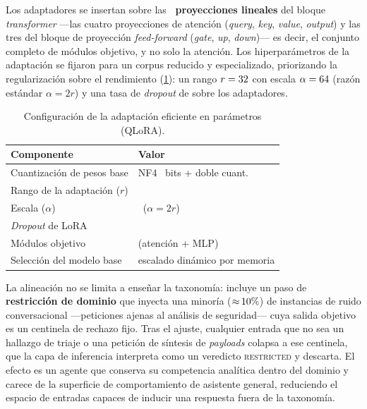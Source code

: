 Los adaptadores se insertan sobre las \textbf{\IALoraModulos{}~proyecciones
lineales} del bloque \emph{transformer} ---las cuatro proyecciones de atención
(\emph{query}, \emph{key}, \emph{value}, \emph{output}) y las tres del bloque de
proyección \emph{feed-forward} (\emph{gate}, \emph{up}, \emph{down})--- es decir,
el conjunto completo de módulos objetivo, y no solo la atención. Los
hiperparámetros de la adaptación se fijaron para un corpus reducido y
especializado, priorizando la regularización sobre el rendimiento
(\cref{tab:ia-qlora}): un rango $r = \num{32}{}$ con escala
$\alpha = \num{64}{}$ (razón estándar $\alpha = 2r$) y una tasa de
\emph{dropout} de \IALoraDropout{} sobre los adaptadores.

\begin{table}[t]
  \centering
  \caption{Configuración de la adaptación eficiente en parámetros (QLoRA).}
  \label{tab:ia-qlora}
  \footnotesize
  \setlength{\tabcolsep}{4pt}
  \begin{tabular}{ll}
    \toprule
    Componente & Valor \\
    \midrule
    Cuantización de pesos base   & NF4 \IACuantBits{}~bits + doble cuant. \\
    Rango de la adaptación ($r$) & \IALoraR{} \\
    Escala ($\alpha$)            & \IALoraAlpha{} \ ($\alpha = 2r$) \\
    \emph{Dropout} de LoRA       & \IALoraDropout{} \\
    Módulos objetivo             & \IALoraModulos{} (atención + MLP) \\
    Selección del modelo base    & escalado dinámico por memoria \\
    \bottomrule
  \end{tabular}
\end{table}

La alineación no se limita a enseñar la taxonomía: incluye un paso de
\textbf{restricción de dominio} que inyecta una minoría (${\approx}\,
\num{10}\%{}$) de instancias de ruido conversacional ---peticiones ajenas
al análisis de seguridad--- cuya salida objetivo es un centinela de rechazo
fijo. Tras el ajuste, cualquier entrada que no sea un hallazgo de triaje o una
petición de síntesis de \emph{payloads} colapsa a ese centinela, que la capa de
inferencia interpreta como un veredicto \textsc{restricted} y descarta. El
efecto es un agente que conserva su competencia analítica dentro del dominio y
carece de la superficie de comportamiento de asistente general, reduciendo el
espacio de entradas capaces de inducir una respuesta fuera de la taxonomía.

